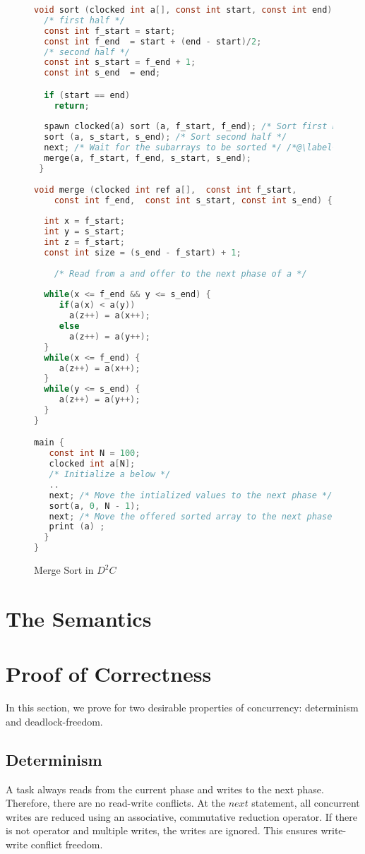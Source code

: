 \documentclass[10pt, conference, compsocconf]{IEEEtran}
\begin{document}
\begin{figure}[htbp]
\begin{lstlisting}[language=C]
void sort (clocked int a[], const int start, const int end)  {
  /* first half */
  const int f_start = start;
  const int f_end  = start + (end - start)/2;
  /* second half */
  const int s_start = f_end + 1;
  const int s_end  = end;

  if (start == end)
    return;
        	
  spawn clocked(a) sort (a, f_start, f_end); /* Sort first half */ 
  sort (a, s_start, s_end); /* Sort second half */ 
  next; /* Wait for the subarrays to be sorted */ /*@\label{line:next1}@*/;
  merge(a, f_start, f_end, s_start, s_end);
 }
    
void merge (clocked int ref a[],  const int f_start, 
    const int f_end,  const int s_start, const int s_end) {
    	
  int x = f_start;
  int y = s_start;
  int z = f_start;
  const int size = (s_end - f_start) + 1;
  
    /* Read from a and offer to the next phase of a */   
 
  while(x <= f_end && y <= s_end) {
     if(a(x) < a(y))
       a(z++) = a(x++);
     else
       a(z++) = a(y++);
  }
  while(x <= f_end) {
     a(z++) = a(x++);
  }
  while(y <= s_end) {
     a(z++) = a(y++);
  }
}

main {
   const int N = 100;
   clocked int a[N]; 
   /* Initialize a below */
   ..
   next; /* Move the intialized values to the next phase */ 
   sort(a, 0, N - 1);
   next; /* Move the offered sorted array to the next phase */
   print (a) ; 
  }
}
\end{lstlisting}
\caption{Merge Sort in $D^2C$}
\label{fig:mergesort}
\end{figure}
\section{The Semantics}
\label{sec:semantics}

\section{Proof of Correctness}
\label{sec:proof}
In this section, we prove for two desirable properties of concurrency: determinism
and deadlock-freedom.

\subsection{Determinism}
A task always reads from the current phase and writes to the next phase.
Therefore, there are no read-write conflicts.
At the $next$ statement, all concurrent writes are reduced using an associative, commutative
reduction operator. If there is not operator and multiple writes,
the writes are ignored. This ensures write-write conflict freedom.
\end{document}
